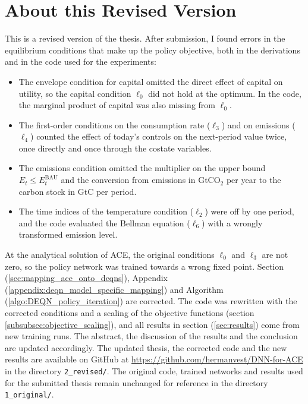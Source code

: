 \section*{About this Revised Version}

This is a revised version of the thesis. After submission, I found errors in the equilibrium conditions that make up the policy objective, both in the derivations and in the code used for the experiments:

\begin{itemize}
    \item The envelope condition for capital omitted the direct effect of capital on utility, so the capital condition \(\ell_0\) did not hold at the optimum. In the code, the marginal product of capital was also missing from \(\ell_0\).
    \item The first-order conditions on the consumption rate (\(\ell_3\)) and on emissions (\(\ell_4\)) counted the effect of today's controls on the next-period value twice, once directly and once through the costate variables.
    \item The emissions condition omitted the multiplier on the upper bound \(E_t \leq E_t^{\text{BAU}}\) and the conversion from emissions in GtCO\(_2\) per year to the carbon stock in GtC per period.
    \item The time indices of the temperature condition (\(\ell_2\)) were off by one period, and the code evaluated the Bellman equation (\(\ell_6\)) with a wrongly transformed emission level.
\end{itemize}

At the analytical solution of ACE, the original conditions \(\ell_0\) and \(\ell_3\) are not zero, so the policy network was trained towards a wrong fixed point. Section (\ref{sec:mapping_ace_onto_deqns}), Appendix (\ref{appendix:deqn_model_specific_mapping}) and Algorithm (\ref{algo:DEQN_policy_iteration}) are corrected. The code was rewritten with the corrected conditions and a scaling of the objective functions (section \ref{subsubsec:objective_scaling}), and all results in section (\ref{sec:results}) come from new training runs. The abstract, the discussion of the results and the conclusion are updated accordingly. The updated thesis, the corrected code and the new results are available on GitHub at \url{https://github.com/hermanvest/DNN-for-ACE} in the directory \texttt{2\_revised/}. The original code, trained networks and results used for the submitted thesis remain unchanged for reference in the directory \texttt{1\_original/}.
